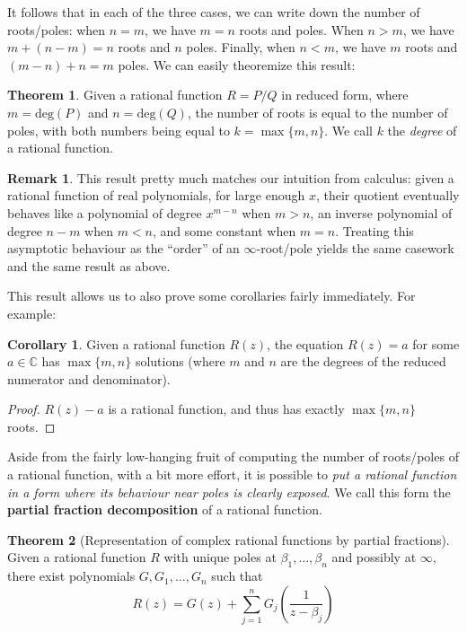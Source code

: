 \documentclass[aps,pra,showpacs,notitlepage,onecolumn,superscriptaddress,nofootinbib]{revtex4-1}
\theoremstyle{definition}
\newtheorem{theorem}{Theorem}[section]
\newtheorem{corollary}{Corollary}[theorem]
\newtheorem{remark}{Remark}[section]
\newcommand{\hhrulefill}{\hspace{-1.5em} \hrulefill}
\begin{document}
It follows that in each of the three cases, we can write down the number of roots/poles: when $n = m$, we have $m = n$ roots and poles. When $n > m$, we have $m + (n - m) = n$ roots and $n$ poles. Finally, when $n < m$,
we have $m$ roots and $(m - n) + n = m$ poles. We can easily theoremize this result:

\hhrulefill

\begin{theorem}
  Given a rational function $R = P/Q$ in reduced form, where $m = \text{deg}(P)$ and $n = \text{deg}(Q)$, the number of roots is equal to the number of poles, with both numbers being equal to $k = \max\{m, n\}$.
  We call $k$ the \emph{degree} of a rational function.
\end{theorem}

\hhrulefill

\begin{remark}
  This result pretty much matches our intuition from calculus: given a rational function of real polynomials, for large enough $x$, their quotient eventually behaves like a polynomial of degree $x^{m - n}$ when $m > n$,
  an inverse polynomial of degree $n - m$ when $m < n$, and some constant when $m = n$. Treating this asymptotic behaviour as the ``order'' of an $\infty$-root/pole yields the same casework and the same result as above.
\end{remark}

\noindent This result allows us to also prove some corollaries fairly immediately. For example:

\begin{corollary}
  \label{cor:exist}
  Given a rational function $R(z)$, the equation $R(z) = a$ for some $a \in \mathbb{C}$ has $\max\{m, n\}$ solutions (where $m$ and $n$ are the degrees of the reduced numerator and denominator).
\end{corollary}
\begin{proof}
  $R(z) - a$ is a rational function, and thus has exactly $\max\{m, n\}$ roots.
\end{proof}

\noindent Aside from the fairly low-hanging fruit of computing the number of roots/poles of a rational function, with a bit more effort, it is possible to \emph{put a rational function in a form
where its behaviour near poles is clearly exposed}. We call this form the \textbf{partial fraction decomposition} of a rational function.

\begin{theorem}[Representation of complex rational functions by partial fractions]
  Given a rational function $R$ with unique poles at $\beta_1, \dots, \beta_n$ and possibly at $\infty$, there exist polynomials $G, G_1, \dots, G_n$ such that
  \begin{equation}
    R(z) = G(z) + \displaystyle\sum_{j = 1}^{n} G_j \left( \frac{1}{z - \beta_j}\right)
  \end{equation}
\end{theorem}
\end{document}
